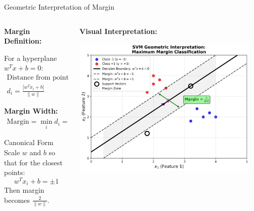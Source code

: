 \documentclass[8pt,aspectratio=1610]{beamer}
\begin{document}
\begin{frame}{Geometric Interpretation of Margin}
\begin{columns}[t]
\begin{column}{0.48\textwidth}
\textbf{Margin Definition:}
\vspace{0.2cm}

For a hyperplane $w^T x + b = 0$:
\begin{align}
\text{Distance from point } x_i \text{ to hyperplane:} \\
d_i = \frac{|w^T x_i + b|}{\|w\|}
\end{align}

\vspace{0.3cm}
\textbf{Margin Width:}
\begin{align}
\text{Margin} = \min_{i} d_i = \frac{1}{\|w\|}
\end{align}

\vspace{0.3cm}
\begin{block}{Canonical Form}
Scale $w$ and $b$ so that for the closest points:
$$w^T x_i + b = \pm 1$$
Then margin becomes $\frac{2}{\|w\|}$.
\end{block}
\end{column}

\begin{column}{0.48\textwidth}
\textbf{Visual Interpretation:}
\vspace{0.2cm}

\includegraphics[width=0.95\textwidth]{../figures/svm_geometry.png}


\end{column}
\end{columns}
\end{frame}
\end{document}
